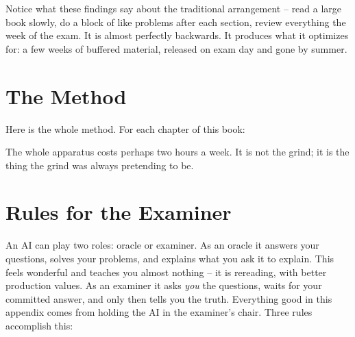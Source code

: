 Notice what these findings say about the traditional arrangement --
read a large book slowly, do a block of like problems after each
section, review everything the week of the exam. It is almost perfectly
backwards. It produces what it optimizes for: a few weeks of buffered
material, released on exam day and gone by summer.

\section{The Method}
Here is the whole method. For each chapter of this book:

\beginEnum
{}
\endEnum

The whole apparatus costs perhaps two hours a week. It is not the
grind; it is the thing the grind was always pretending to be.

\section{Rules for the Examiner}
An AI can play two roles: oracle or examiner. As an oracle it answers
your questions, solves your problems, and explains what you ask it to
explain. This feels wonderful and teaches you almost nothing -- it is
rereading, with better production values. As an examiner it asks {\it
you\/} the questions, waits for your committed answer, and only then
tells you the truth. Everything good in this appendix comes from
holding the AI in the examiner's chair. Three rules accomplish this:

